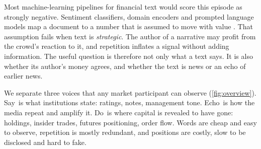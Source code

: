 \documentclass{article}
\theoremstyle{plain}
\theoremstyle{definition}
\theoremstyle{remark}
\newcommand{\SAY}{\textcolor{say}{\textsf{Say}}}
\newcommand{\ECHO}{\textcolor{echo}{\textsf{Echo}}}
\newcommand{\DO}{\textcolor{do}{\textsf{Do}}}
\begin{document}
Most machine-learning pipelines for financial text would score this episode as strongly negative. Sentiment classifiers, domain encoders and prompted language models map a document to a number that is assumed to move with value \citep{ke2019,araci2019,lopezlira2023}. That assumption fails when text is \emph{strategic}. The author of a narrative may profit from the crowd's reaction to it, and repetition inflates a signal without adding information. The useful question is therefore not only what a text says. It is also whether its author's money agrees, and whether the text is news or an echo of earlier news.

We separate three voices that any market participant can observe (\cref{fig:overview}). \SAY\ is what institutions state: ratings, notes, management tone. \ECHO\ is how the media repeat and amplify it. \DO\ is where capital is revealed to have gone: holdings, insider trades, futures positioning, order flow. Words are cheap and easy to observe, repetition is mostly redundant, and positions are costly, slow to be disclosed and hard to fake.
\end{document}

